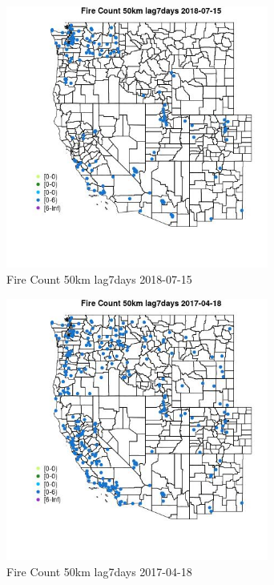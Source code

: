 \begin{figure} 
\centering  
\includegraphics[width=0.77\textwidth]{Code_Outputs/Report_ML_input_PM25_Step4_part_e_de_duplicated_aves_compiled_2019-05-20wNAs_MapObsFire_Count_50km_lag7days2018-07-15.jpg} 
\caption{\label{fig:Report_ML_input_PM25_Step4_part_e_de_duplicated_aves_compiled_2019-05-20wNAsMapObsFire_Count_50km_lag7days2018-07-15}Fire Count 50km lag7days 2018-07-15} 
\end{figure} 
 

\begin{figure} 
\centering  
\includegraphics[width=0.77\textwidth]{Code_Outputs/Report_ML_input_PM25_Step4_part_e_de_duplicated_aves_compiled_2019-05-20wNAs_MapObsFire_Count_50km_lag7days2017-04-18.jpg} 
\caption{\label{fig:Report_ML_input_PM25_Step4_part_e_de_duplicated_aves_compiled_2019-05-20wNAsMapObsFire_Count_50km_lag7days2017-04-18}Fire Count 50km lag7days 2017-04-18} 
\end{figure} 
 

